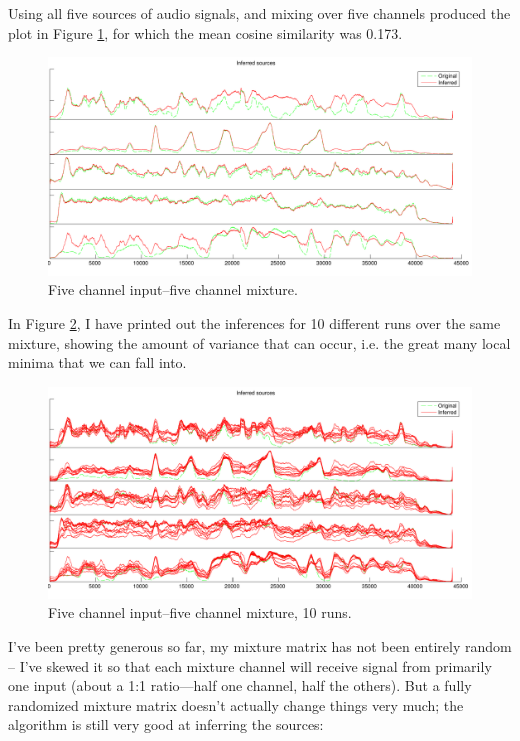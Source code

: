\documentclass[11pt]{report}
\begin{document}
Using all five sources of audio signals, and mixing over five channels produced the plot in Figure \ref{fig:c}, for which the mean cosine similarity was 0.173.
\begin{figure}[H]
  \centering
  \includegraphics[width=\textwidth]{../plots/goodmatch5.pdf}
  \caption{Five channel input--five channel mixture.}
  \label{fig:c}
\end{figure}
In Figure \ref{fig:d}, I have printed out the inferences for 10 different runs over the same mixture, showing the amount of variance that can occur, i.e. the great many local minima that we can fall into.
\begin{figure}[H]
  \centering
  \includegraphics[width=\textwidth]{../plots/5channels10.pdf}
  \caption{Five channel input--five channel mixture, 10 runs.}
  \label{fig:d}
\end{figure}
I've been pretty generous so far, my mixture matrix has not been entirely random -- I've skewed it so that each mixture channel will receive signal from primarily one input (about a 1:1 ratio---half one channel, half the others). But a fully randomized mixture matrix doesn't actually change things very much; the algorithm is still very good at inferring the sources:
\end{document}

